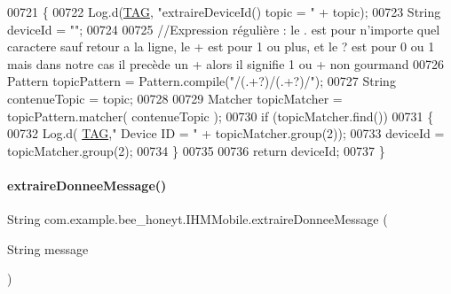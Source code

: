 \begin{DoxyCode}
00721     \{
00722         Log.d(\hyperlink{classcom_1_1example_1_1bee__honeyt_1_1_i_h_m_mobile_a366987bf9bb2ed1010b2f967d4efa263}{TAG}, \textcolor{stringliteral}{"extraireDeviceId() topic = "} + topic);
00723         String deviceId = \textcolor{stringliteral}{""};
00724 
00725         \textcolor{comment}{//Expression régulière : le . est pour n'importe quel caractere sauf retour a la ligne, le + est
       pour 1 ou plus, et le ? est pour 0 ou 1 mais dans notre cas il precède un + alors il signifie 1 ou + non
       gourmand}
00726         Pattern topicPattern = Pattern.compile(\textcolor{stringliteral}{"/(.+?)/(.+?)/"});
00727         String contenueTopic = topic;
00728 
00729         Matcher topicMatcher = topicPattern.matcher( contenueTopic );
00730         \textcolor{keywordflow}{if} (topicMatcher.find())
00731         \{
00732             Log.d( \hyperlink{classcom_1_1example_1_1bee__honeyt_1_1_i_h_m_mobile_a366987bf9bb2ed1010b2f967d4efa263}{TAG},\textcolor{stringliteral}{" Device ID = "} + topicMatcher.group(2));
00733             deviceId = topicMatcher.group(2);
00734         \}
00735 
00736         \textcolor{keywordflow}{return} deviceId;
00737     \}
\end{DoxyCode}
\mbox{\label{classcom_1_1example_1_1bee__honeyt_1_1_i_h_m_mobile_a2f781039138b814510102847e70917a1}} 
\paragraph{\texorpdfstring{extraire\+Donnee\+Message()}{extraireDonneeMessage()}}
{\footnotesize\ttfamily String com.\+example.\+bee\+\_\+honeyt.\+I\+H\+M\+Mobile.\+extraire\+Donnee\+Message (\begin{DoxyParamCaption}\item[{String}]{message }\end{DoxyParamCaption})\hspace{0.3cm}{\ttfamily [private]}}

